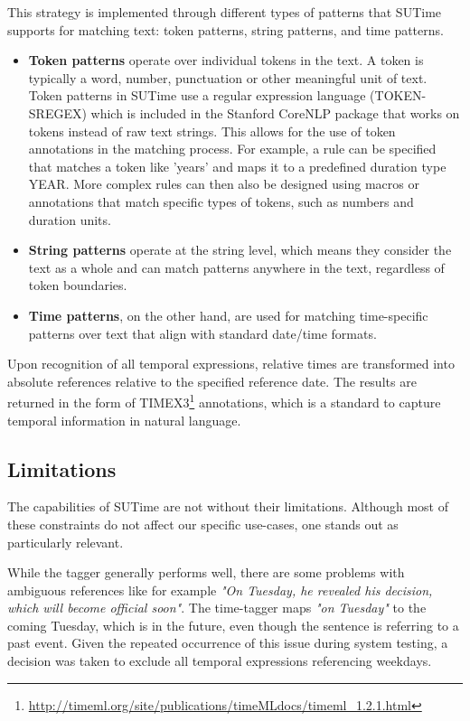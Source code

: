 \documentclass[12pt,oneside,bibtotoc,liststotoc]{scrbook}
\begin{document}
This strategy is implemented through different types of patterns that SUTime supports for matching text: token patterns, string patterns, and time patterns.

\begin{itemize}
  \item \textbf{Token patterns} operate over individual tokens in the text. A token is typically a word, number, punctuation or other meaningful unit of text. Token patterns in SUTime use a regular expression language (TOKEN-SREGEX) which is included in the Stanford CoreNLP package that works on tokens instead of raw text strings. This allows for the use of token annotations in the matching process. For example, a rule can be specified that matches a token like 'years' and maps it to a predefined duration type YEAR. More complex rules can then also be designed using macros or annotations that match specific types of tokens, such as numbers and duration units.

  \item \textbf{String patterns} operate at the string level, which means they consider the text as a whole and can match patterns anywhere in the text, regardless of token boundaries.

  \item \textbf{Time patterns}, on the other hand, are used for matching time-specific patterns over text that align with standard date/time formats.
\end{itemize}

Upon recognition of all temporal expressions, relative times are transformed into absolute references relative to the specified reference date. The results are returned in the form of TIMEX3\footnote{\url{http://timeml.org/site/publications/timeMLdocs/timeml\_1.2.1.html}} annotations, which is a standard to capture temporal information in natural language. \cite{sutime}

\subsection{Limitations}
\label{sutime_limitations}
The capabilities of SUTime are not without their limitations. Although most of these constraints do not affect our specific use-cases, one stands out as particularly relevant.

While the tagger generally performs well, there are some problems with ambiguous references like for example \textit{"On Tuesday, he revealed his decision, which will become official soon"}. The time-tagger maps \textit{"on Tuesday"} to the coming Tuesday, which is in the future, even though the sentence is referring to a past event. Given the repeated occurrence of this issue during system testing, a decision was taken to exclude all temporal expressions referencing weekdays. \cite{sutime}
\end{document}
